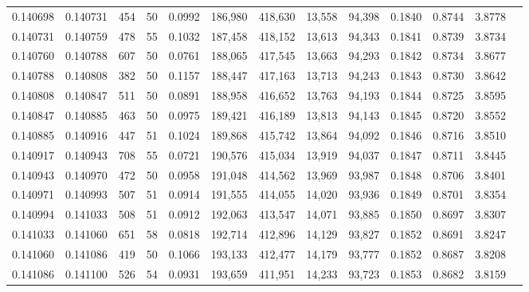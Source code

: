 \begin{tabular}{rrrrrrrrrrrrr}
0.140698 & 0.140731 &   454 &  50 &                                     0.0992 & 186,980 & 418,630 &  13,558 &  94,398 & 0.1840 & 0.8744 & 3.8778 \\
0.140731 & 0.140759 &   478 &  55 &                                     0.1032 & 187,458 & 418,152 &  13,613 &  94,343 & 0.1841 & 0.8739 & 3.8734 \\
0.140760 & 0.140788 &   607 &  50 &                                     0.0761 & 188,065 & 417,545 &  13,663 &  94,293 & 0.1842 & 0.8734 & 3.8677 \\
0.140788 & 0.140808 &   382 &  50 &                                     0.1157 & 188,447 & 417,163 &  13,713 &  94,243 & 0.1843 & 0.8730 & 3.8642 \\
0.140808 & 0.140847 &   511 &  50 &                                     0.0891 & 188,958 & 416,652 &  13,763 &  94,193 & 0.1844 & 0.8725 & 3.8595 \\
0.140847 & 0.140885 &   463 &  50 &                                     0.0975 & 189,421 & 416,189 &  13,813 &  94,143 & 0.1845 & 0.8720 & 3.8552 \\
0.140885 & 0.140916 &   447 &  51 &                                     0.1024 & 189,868 & 415,742 &  13,864 &  94,092 & 0.1846 & 0.8716 & 3.8510 \\
0.140917 & 0.140943 &   708 &  55 &                                     0.0721 & 190,576 & 415,034 &  13,919 &  94,037 & 0.1847 & 0.8711 & 3.8445 \\
0.140943 & 0.140970 &   472 &  50 &                                     0.0958 & 191,048 & 414,562 &  13,969 &  93,987 & 0.1848 & 0.8706 & 3.8401 \\
0.140971 & 0.140993 &   507 &  51 &                                     0.0914 & 191,555 & 414,055 &  14,020 &  93,936 & 0.1849 & 0.8701 & 3.8354 \\
0.140994 & 0.141033 &   508 &  51 &                                     0.0912 & 192,063 & 413,547 &  14,071 &  93,885 & 0.1850 & 0.8697 & 3.8307 \\
0.141033 & 0.141060 &   651 &  58 &                                     0.0818 & 192,714 & 412,896 &  14,129 &  93,827 & 0.1852 & 0.8691 & 3.8247 \\
0.141060 & 0.141086 &   419 &  50 &                                     0.1066 & 193,133 & 412,477 &  14,179 &  93,777 & 0.1852 & 0.8687 & 3.8208 \\
0.141086 & 0.141100 &   526 &  54 &                                     0.0931 & 193,659 & 411,951 &  14,233 &  93,723 & 0.1853 & 0.8682 & 3.8159 \\

\end{tabular}
